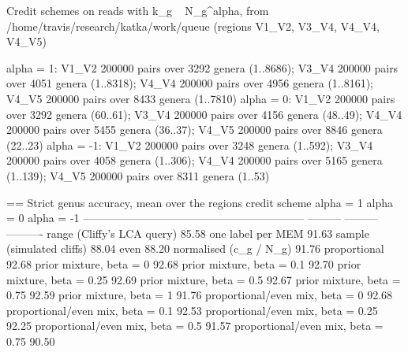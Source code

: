 Credit schemes on reads with k_g ~ N_g^alpha, from /home/travis/research/katka/work/queue (regions V1_V2, V3_V4, V4_V4, V4_V5)

alpha = 1: V1_V2 200000 pairs over 3292 genera (1..8686); V3_V4 200000 pairs over 4051 genera (1..8318); V4_V4 200000 pairs over 4956 genera (1..8161); V4_V5 200000 pairs over 8433 genera (1..7810)
alpha = 0: V1_V2 200000 pairs over 3292 genera (60..61); V3_V4 200000 pairs over 4156 genera (48..49); V4_V4 200000 pairs over 5455 genera (36..37); V4_V5 200000 pairs over 8846 genera (22..23)
alpha = -1: V1_V2 200000 pairs over 3248 genera (1..592); V3_V4 200000 pairs over 4058 genera (1..306); V4_V4 200000 pairs over 5165 genera (1..139); V4_V5 200000 pairs over 8311 genera (1..53)

== Strict genus accuracy, mean over the regions
  credit scheme                                                 alpha = 1  alpha = 0  alpha = -1
  ------------------------------------------------------------  ---------  ---------  ----------
  range (Cliffy's LCA query)                                       85.58%
  one label per MEM                                                91.63%
  sample (simulated cliffs)                                        88.04%
  even                                                             88.20%
  normalised (c_g / N_g)                                           91.76%
  proportional                                                     92.68%
  prior mixture, beta = 0                                          92.68%
  prior mixture, beta = 0.1                                        92.70%
  prior mixture, beta = 0.25                                       92.69%
  prior mixture, beta = 0.5                                        92.67%
  prior mixture, beta = 0.75                                       92.59%
  prior mixture, beta = 1                                          91.76%
  proportional/even mix, beta = 0                                  92.68%
  proportional/even mix, beta = 0.1                                92.53%
  proportional/even mix, beta = 0.25                               92.25%
  proportional/even mix, beta = 0.5                                91.57%
  proportional/even mix, beta = 0.75                               90.50%
